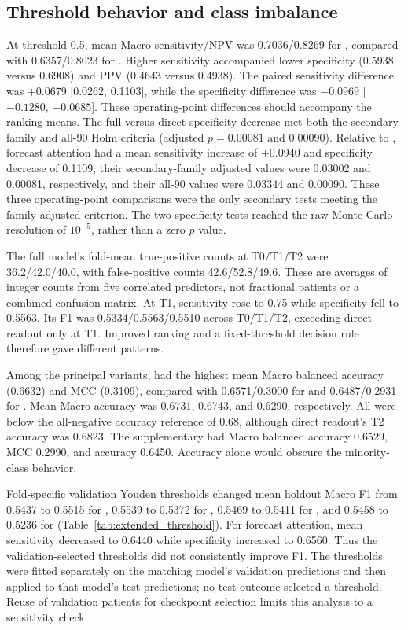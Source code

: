 \subsection{Threshold behavior and class imbalance}

At threshold 0.5, mean Macro sensitivity/NPV was 0.7036/0.8269 for \fullmodel{}, compared with 0.6357/0.8023 for \direct{}. Higher sensitivity accompanied lower specificity (0.5938 versus 0.6908) and PPV (0.4643 versus 0.4938). The paired sensitivity difference was +0.0679 [0.0262, 0.1103], while the specificity difference was $-0.0969$ [$-0.1280$, $-0.0685$]. These operating-point differences should accompany the ranking means. The full-versus-direct specificity decrease met both the secondary-family and all-90 Holm criteria (adjusted $p=0.00081$ and 0.00090). Relative to \nojepa{}, forecast attention had a mean sensitivity increase of +0.0940 and specificity decrease of 0.1109; their secondary-family adjusted values were 0.03002 and 0.00081, respectively, and their all-90 values were 0.03344 and 0.00090. These three operating-point comparisons were the only secondary tests meeting the family-adjusted criterion. The two specificity tests reached the raw Monte Carlo resolution of $10^{-5}$, rather than a zero $p$ value.

The full model's fold-mean true-positive counts at T0/T1/T2 were 36.2/42.0/40.0, with false-positive counts 42.6/52.8/49.6. These are averages of integer counts from five correlated predictors, not fractional patients or a combined confusion matrix. At T1, sensitivity rose to 0.75 while specificity fell to 0.5563. Its F1 was 0.5334/0.5563/0.5510 across T0/T1/T2, exceeding direct readout only at T1. Improved ranking and a fixed-threshold decision rule therefore gave different patterns.

Among the principal variants, \direct{} had the highest mean Macro balanced accuracy (0.6632) and MCC (0.3109), compared with 0.6571/0.3000 for \nojepa{} and 0.6487/0.2931 for \fullmodel{}. Mean Macro accuracy was 0.6731, 0.6743, and 0.6290, respectively. All were below the all-negative accuracy reference of 0.68, although direct readout's T2 accuracy was 0.6823. The supplementary \meanmodel{} had Macro balanced accuracy 0.6529, MCC 0.2990, and accuracy 0.6450. Accuracy alone would obscure the minority-class behavior.

Fold-specific validation Youden thresholds changed mean holdout Macro F1 from 0.5437 to 0.5515 for \nojepa{}, 0.5539 to 0.5372 for \direct{}, 0.5469 to 0.5411 for \fullmodel{}, and 0.5458 to 0.5236 for \meanmodel{} (Table~\ref{tab:extended_threshold}). For forecast attention, mean sensitivity decreased to 0.6440 while specificity increased to 0.6560. Thus the validation-selected thresholds did not consistently improve F1. The thresholds were fitted separately on the matching model's validation predictions and then applied to that model's test predictions; no test outcome selected a threshold. Reuse of validation patients for checkpoint selection limits this analysis to a sensitivity check.

